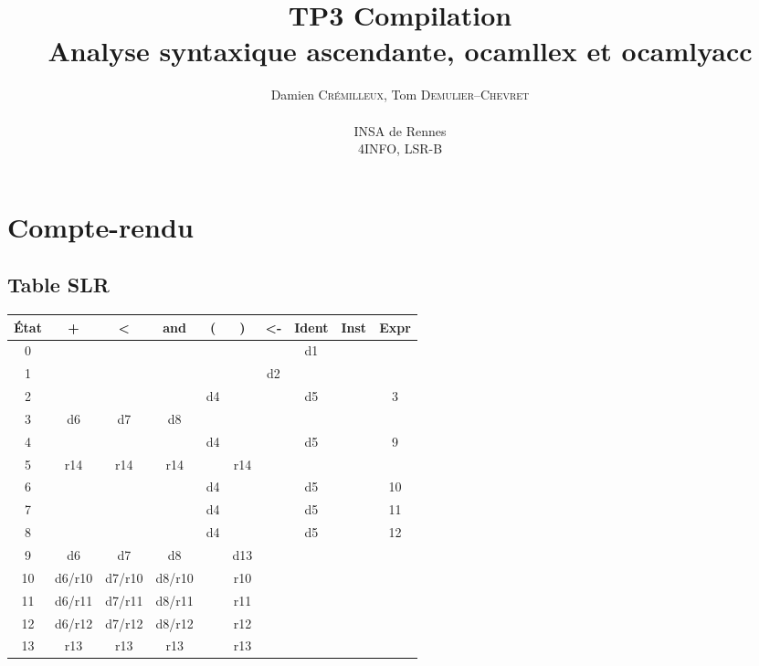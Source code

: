 \documentclass[a4paper]{article}
\author{
  Damien \textsc{Crémilleux}, Tom \textsc{Demulier--Chevret} \\ \\
  INSA de Rennes \\
  4INFO, LSR-B
}
\title{TP3 Compilation \\ Analyse syntaxique ascendante, ocamllex et ocamlyacc}
\date{}
\begin{document}
\maketitle

\section{Compte-rendu}

\subsection{Table SLR}
\begin{center}
  \begin{tabular}{| c || c | c | c | c | c | c | c || c | c |}
    \hline
    État & + & < & and & ( & ) & <- & Ident & Inst & Expr  \\ \hline
    0    &   &   &     &   &   &    &  d1   &      &       \\ \hline
    1    &   &   &     &   &   & d2 &       &      &       \\ \hline
    2    &   &   &     & d4&   &    &   d5  &      & 3     \\ \hline
    3    & d6& d7& d8  &   &   &    &       &      &       \\ \hline
    4    &   &   &     & d4&   &    & d5    &      & 9     \\ \hline
    5    &r14&r14&r14  &   &r14&    &       &      &       \\ \hline
    6    &   &   &     & d4&   &    &   d5  &      & 10    \\ \hline
    7    &   &   &     & d4&   &    & d5    &      & 11    \\ \hline
    8    &   &   &     & d4&   &    & d5    &      &  12   \\ \hline
    9    & d6& d7&   d8&   &d13&    &       &      &       \\ \hline
    10   &d6/r10 &d7/r10 &d8/r10   &   &r10&    &       &      &       \\ \hline
    11   &d6/r11 &d7/r11 &d8/r11   &   &r11&    &       &      &       \\ \hline
    12   &d6/r12 &d7/r12 &d8/r12   &   &r12&    &       &      &       \\ \hline
    13   &r13&r13&r13  &   &r13&    &       &      &       \\ \hline
  \end{tabular}
\end{center}
\end{document}
